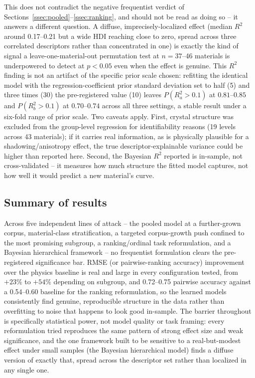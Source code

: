 \documentclass[aip,amsmath,amssymb,reprint]{revtex4-1}
\begin{document}
This does not contradict the negative frequentist verdict of
Sections~\ref{ssec:pooled}--\ref{ssec:ranking}, and should not be read
as doing so -- it answers a different question. A diffuse,
imprecisely-localized effect (median $R^2$ around 0.17--0.21 but a wide
HDI reaching close to zero, spread across three correlated descriptors
rather than concentrated in one) is exactly the kind of signal a
leave-one-material-out permutation test at $n=37$--46 materials is
underpowered to detect at $p<0.05$ even when the effect is genuine.
This $R^2$ finding is not an artifact of the specific prior scale chosen:
refitting the identical model with the regression-coefficient prior
standard deviation set to half (5) and three times (30) the
pre-registered value (10) leaves $P(R^2_a{>}0.1)$ at $0.81$--$0.85$ and
$P(R^2_b{>}0.1)$ at $0.70$--$0.74$ across all three settings, a stable
result under a six-fold range of prior scale.
Two caveats apply. First, crystal structure was excluded from the
group-level regression for identifiability reasons (19 levels across
43 materials); if it carries real information, as is physically
plausible for a shadowing/anisotropy effect, the true
descriptor-explainable variance could be higher than reported here.
Second, the Bayesian $R^2$ reported is in-sample, not
cross-validated -- it measures how much structure the fitted model
captures, not how well it would predict a new material's curve.

\subsection{Summary of results}
\label{ssec:results_summary}

Across five independent lines of attack -- the pooled model at a
further-grown corpus, material-class stratification, a targeted
corpus-growth push confined to the most promising subgroup, a
ranking/ordinal task reformulation, and a Bayesian hierarchical
framework -- no frequentist formulation clears the pre-registered
significance bar. RMSE (or pairwise-ranking accuracy) improvement
over the physics baseline is real and large in every configuration
tested, from $+23\%$ to $+54\%$ depending on subgroup, and 0.72--0.75
pairwise accuracy against a 0.54--0.60 baseline for the ranking
reformulation, so the learned models consistently find genuine,
reproducible structure in the data rather than overfitting to noise
that happens to look good in-sample. The barrier throughout is
specifically statistical power, not model quality or task framing:
every reformulation tried reproduces the same pattern of strong effect
size and weak significance, and the one framework built to be
sensitive to a real-but-modest effect under small samples (the
Bayesian hierarchical model) finds a diffuse version of exactly that,
spread across the descriptor set rather than localized in any single
one.
\end{document}

